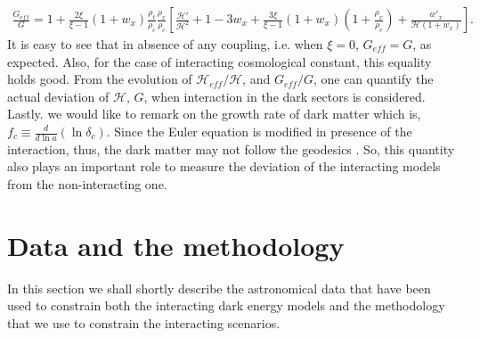 \documentclass[superscriptaddress,oneolumn,secnumarabic,
amssymb,amsmath,nobibnotes,aps,prd,showpacs,nofootinbib]{revtex4}%
\begin{document}
\begin{eqnarray}
\frac{G_{eff}}{G}=1+ \frac{2 \xi}{\xi-1}(1+w_x)\frac{\rho_{t}}{\rho_c}\frac{\rho_x}{\rho_c}
\left[ \frac{\mathcal{H}'}{\mathcal{H}^2}+1-3w_x+\frac{3 \xi}{\xi-1}(1+w_x)\left(1+\frac{\rho_x}{\rho_c}\right)+\frac{w'_x}{\mathcal{H}(1+w_x)} \right].
\label{eq:Geff}
\end{eqnarray}
It is easy to see that in absence of any coupling, i.e. when $\xi = 0$, $G_{eff} = G$, as expected. Also, for the case of interacting cosmological constant, this equality holds good. From the evolution of $\mathcal{H}_{eff}/\mathcal{H}$, and $G_{eff}/G$, one can quantify the actual deviation of $\mathcal{H}$, $G$, when interaction in the dark sectors is considered. Lastly. we would like to remark on the growth rate of dark matter which is, $f_c \equiv \frac{d}{d\ln a}(\ln \delta_c) $. Since the Euler equation is  modified in presence of the interaction, thus, the dark matter may not follow the geodesics \cite{Koyama:2009gd}. So, this quantity also plays an important role to measure the deviation of the interacting models from the non-interacting one.




\section{Data and the methodology}
\label{sec-data}

In this section we shall shortly describe the astronomical data that have been used to constrain both the interacting dark energy models and the methodology that we use to constrain the interacting scenarios.
\end{document}
